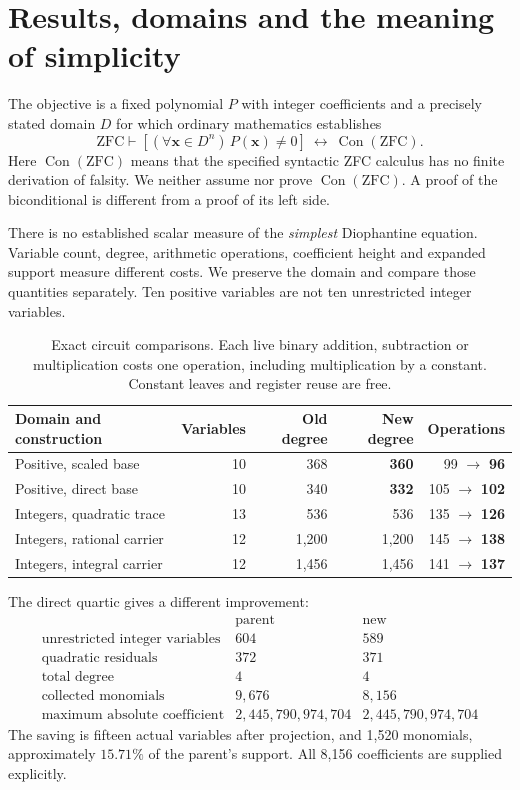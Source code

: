 \documentclass[11pt]{article}
\theoremstyle{remark}
\newcommand{\Con}{\operatorname{Con}(\mathrm{ZFC})}
\begin{document}
\section{Results, domains and the meaning of simplicity}

The objective is a fixed polynomial $P$ with integer coefficients and a
precisely stated domain $D$ for which ordinary mathematics establishes
\[
 \mathrm{ZFC}\vdash
 \left[(\forall\boldsymbol{x}\in D^n)\,
        P(\boldsymbol{x})\ne0\right]\ \longleftrightarrow\ \Con.
 \tag{1}
\]
Here $\Con$ means that the specified syntactic ZFC calculus has no finite
derivation of falsity. We neither assume nor prove $\Con$.
A proof of the biconditional is different from a proof of its left side.

There is no established scalar measure of the \emph{simplest} Diophantine
equation. Variable count, degree, arithmetic operations, coefficient height
and expanded support measure different costs. We preserve the domain and
compare those quantities separately. Ten positive variables are not ten
unrestricted integer variables.

\begin{table}[ht]
\centering\small
\begin{tabular}{@{}lrrrr@{}}
\toprule
Domain and construction & Variables & Old degree & New degree & Operations\\
\midrule
Positive, scaled base &10&368&\textbf{360}&99 $\to$ \textbf{96}\\
Positive, direct base &10&340&\textbf{332}&105 $\to$ \textbf{102}\\
Integers, quadratic trace &13&536&536&135 $\to$ \textbf{126}\\
Integers, rational carrier &12&1,200&1,200&145 $\to$ \textbf{138}\\
Integers, integral carrier &12&1,456&1,456&141 $\to$ \textbf{137}\\
\bottomrule
\end{tabular}
\caption{Exact circuit comparisons. Each live binary addition, subtraction
or multiplication costs one operation, including multiplication by a
constant. Constant leaves and register reuse are free.}
\label{tab:circuits}
\end{table}

The direct quartic gives a different improvement:
\[
\begin{array}{c|rr}
 &\text{parent}&\text{new}\\ \hline
\text{unrestricted integer variables}&604&589\\
\text{quadratic residuals}&372&371\\
\text{total degree}&4&4\\
\text{collected monomials}&9,676&8,156\\
\text{maximum absolute coefficient}&
2,445,790,974,704&2,445,790,974,704
\end{array}
\tag{2}
\]
The saving is fifteen actual variables after projection, and 1,520
monomials, approximately $15.71\%$ of the parent's support.
All 8,156 coefficients are supplied explicitly.
\end{document}
